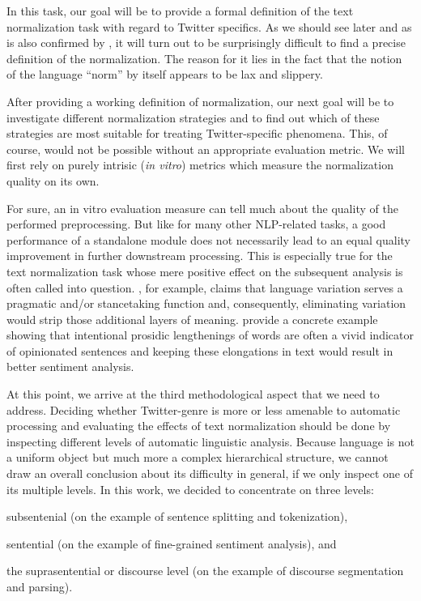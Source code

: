 In this task, our goal will be to provide a formal definition of the text
normalization task with regard to Twitter specifics.  As we should see later
and as is also confirmed by \citet{Eisenstein:13}, it will turn out to be
surprisingly difficult to find a precise definition of the normalization.  The
reason for it lies in the fact that the notion of the language ``norm'' by
itself appears to be lax and slippery.

After providing a working definition of normalization, our next goal will be
to investigate different normalization strategies and to find out which of
these strategies are most suitable for treating Twitter-specific phenomena.
This, of course, would not be possible without an appropriate evaluation
metric.  %
We will first rely on purely intrisic (\emph{in vitro}) metrics which measure
the normalization quality on its own.

For sure, an in vitro evaluation measure can tell much about the
quality of the performed preprocessing.  But like for many other
NLP-related tasks, a good performance of a standalone module does not
necessarily lead to an equal quality improvement in further downstream
processing.  This is especially true for the text normalization task
whose mere positive effect on the subsequent analysis is often called
into question.  \citet{DuBois:07}, for example, claims that language
variation serves a pragmatic and/or stancetaking function and,
consequently, eliminating variation would strip those additional
layers of meaning.  \citet{Brody:11} provide a concrete example
showing that intentional prosidic lengthenings of words are often a
vivid indicator of opinionated sentences and keeping these elongations
in text would result in better sentiment analysis.

At this point, we arrive at the third methodological aspect that we need to
address.  Deciding whether Twitter-genre is more or less amenable to automatic
processing and evaluating the effects of text normalization should be done by
inspecting different levels of automatic linguistic analysis.  Because
language is not a uniform object but much more a complex hierarchical
structure, we cannot draw an overall conclusion about its difficulty in
general, if we only inspect one of its multiple levels.  In this work, we
decided to concentrate on three levels:
\begin{inparaenum}
  \item subsentenial (on the example of sentence splitting and tokenization),
  \item sentential (on the example of fine-grained sentiment analysis), and
  \item the suprasentential or discourse level (on the example of discourse
    segmentation and parsing).
\end{inparaenum}

